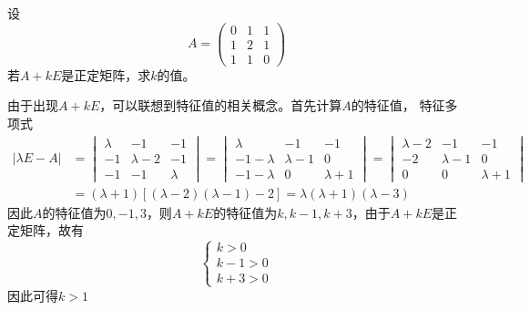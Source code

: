 \begin{example}
    设
    \[
        A =
        \begin{pmatrix}
            0 & 1 & 1 \\
            1 & 2 & 1 \\
            1 & 1 & 0
        \end{pmatrix}
    \]若$A+kE$是正定矩阵，求$k$的值。
\end{example}
\begin{solution}
    由于出现$A+kE$，可以联想到特征值的相关概念。首先计算$A$的特征值，
    特征多项式
    \begin{align*}
        |\lambda E - A| & =
        \begin{vmatrix}
            \lambda & -1        & -1      \\
            -1      & \lambda-2 & -1      \\
            -1      & -1        & \lambda
        \end{vmatrix}
        =
        \begin{vmatrix}
            \lambda    & -1        & -1        \\
            -1-\lambda & \lambda-1 & 0         \\
            -1-\lambda & 0         & \lambda+1
        \end{vmatrix}
        =
        \begin{vmatrix}
            \lambda-2 & -1        & -1        \\
            -2        & \lambda-1 & 0         \\
            0         & 0         & \lambda+1
        \end{vmatrix} \\
                        & =
        (\lambda+1)[(\lambda-2)(\lambda-1)-2]
        =\lambda(\lambda+1)(\lambda - 3)
    \end{align*}
    因此$A$的特征值为$0,-1,3$，则$A+kE$的特征值为$k,k-1,k+3$，由于$A+kE$是正定矩阵，故有
    \[
        \begin{cases}
            k>0   \\
            k-1>0 \\
            k+3>0
        \end{cases}
    \]
    因此可得$k>1$
\end{solution}